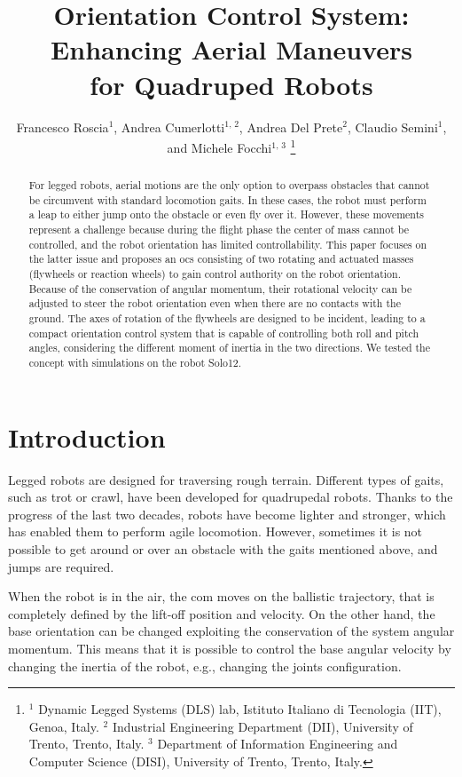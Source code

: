 \documentclass[letterpaper, 10 pt, conference]{ieeeconf}  %
\title{Orientation Control System: Enhancing Aerial Maneuvers \\ for Quadruped Robots}
\author{
	Francesco Roscia$^{1}$, Andrea Cumerlotti$^{1, \, 2}$, Andrea Del Prete$^{2}$, Claudio Semini$^{1}$, and Michele Focchi$^{1, \, 3}$
	\thanks{$^1$ Dynamic Legged Systems (DLS) lab, Istituto Italiano di Tecnologia (IIT), Genoa, Italy.
		$^2$ Industrial Engineering Department (DII), University of Trento, Trento, Italy.
		$^3$ Department of Information Engineering and Computer Science (DISI), University of Trento, Trento, Italy.
}}
\begin{document}
\maketitle
\thispagestyle{empty}
\pagestyle{empty}

\begin{abstract}%
For legged robots, aerial motions are the only option to overpass obstacles that cannot be circumvent with standard locomotion gaits. In these cases, the robot must perform a leap to either jump onto the obstacle or even fly over it. However, these movements represent a challenge because during the flight phase the center of mass cannot be controlled, and the robot orientation has limited controllability. This paper focuses on the latter issue and proposes an \gls{ocs} consisting of two rotating and actuated masses (flywheels or reaction wheels) to gain control authority on the robot orientation. Because of the conservation of angular momentum, their rotational velocity can be adjusted to steer the robot orientation even when there are no contacts with the ground. The axes of rotation of the flywheels are designed to be incident, leading to a compact orientation control system that is capable of controlling both roll and pitch angles, considering the different moment of inertia in the two directions. We tested the concept with simulations on the robot Solo12.
\end{abstract}

	 

\section{Introduction}\label{sec:introduction}
Legged robots are designed for traversing rough terrain.
Different types of gaits, such as trot or crawl, have been developed for quadrupedal robots. 
Thanks to the progress of the last two decades, robots have become lighter and stronger, which has enabled them to perform agile locomotion.
However, sometimes it is not possible to get around or over an obstacle with the gaits mentioned above, and jumps are required. 

When the robot is in the air, the \gls{com} moves on the ballistic trajectory, that is completely defined by the lift-off position and velocity. On the other hand, the base orientation can be changed exploiting the conservation of the system angular momentum. This means that it is possible to control the base angular velocity by changing the inertia of the robot, e.g., changing the joints configuration. 
\end{document}
